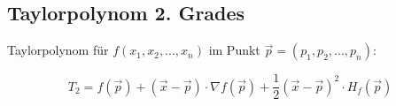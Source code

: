 \subsection{Taylorpolynom 2. Grades} %
\label{sub:taylorpolynom_2_grades}

Taylorpolynom für $f(x_1,x_2,...,x_n)$ im Punkt $\overrightarrow{p} = (p_1,p_2,...,p_n)$:

\begin{equation}
	T_2 = f(\overrightarrow{p}) + (\overrightarrow{x}-\overrightarrow{p}) \cdot \nabla f(\overrightarrow{p})+\frac{1}{2}
	(\overrightarrow{x}-\overrightarrow{p})^2 \cdot H_f(\overrightarrow{p})
\end{equation}

